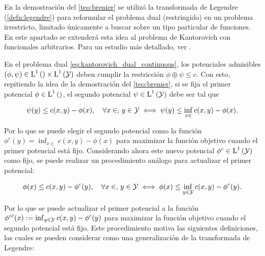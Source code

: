 En la demostración del \autoref{teo:brenier} se utilizó la transformada de Legendre (\autoref{defn:legendre}) para reformular el problema dual (restringido) en un problema irrestricto, limitado únicamente a buscar sobre un tipo particular de funciones. En este apartado se extenderá esta idea al problema de Kantorovich con funcionales arbitrarios. Para un estudio más detallado, ver \cite{villani2003topics}.

En el problema dual \eqref{eq:kantorovich_dual_continuous}, los potenciales admisibles $(\phi,\psi)\in \operatorname{L}^{1}\left(\right)\times\operatorname{L}^{1}\left(\mathcal{Y}\right)$ deben cumplir la restricción $\phi\oplus\psi\leq c$. Con esto, repitiendo la idea de la demostración del \autoref{teo:brenier}, si se fija el primer potencial $\phi\in\operatorname{L}^{1}\left(\right)$, el segundo potencial $\psi\in \operatorname{L}^{1}\left(\mathcal{Y}\right)$ debe ser tal que

\begin{equation*}
	\psi(y) \leq c(x,y) - \phi(x), \quad \forall x\in,\,y\in\mathcal{Y}
	\iff
	\psi(y) \leq \inf_{x\in} c(x,y) - \phi(x) .
\end{equation*}

Por lo que se puede elegir el segundo potencial como la función $\phi^c(y) = \inf_{x\in\xspace} c(x,y) - \phi(x)$ para maximizar la función objetivo cuando el primer potencial está fijo. Considerando ahora este nuevo potencial $\phi^c\in \operatorname{L}^{1}\left(\mathcal{Y}\right)$ como fijo, se puede realizar un procedimiento análogo para actualizar el primer potencial:

\begin{equation*}
	\phi(x) \leq c(x,y) - \phi^c(y), \quad \forall x\in,\,y\in\mathcal{Y}
	\iff
	\phi(x) \leq \inf_{y\in\mathcal{Y}} c(x,y) - \phi^c(y) .
\end{equation*}

Por lo que se puede actualizar el primer potencial a la función $\phi^{c\bar c}(x) := \inf_{y\in\mathcal{Y}} c(x,y) - \phi^c(y)$ para maximizar la función objetivo cuando el segundo potencial está fijo. Este procedimiento motiva las siguientes definiciones, las cuales se pueden considerar como una generalización de la transformada de Legendre:

